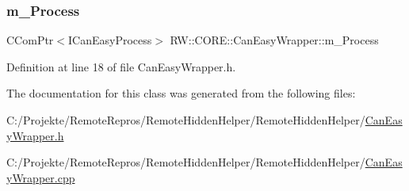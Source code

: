 \subsubsection{\texorpdfstring{m\+\_\+\+Process}{m\_Process}}
{\footnotesize\ttfamily C\+Com\+Ptr$<$I\+Can\+Easy\+Process$>$ R\+W\+::\+C\+O\+R\+E\+::\+Can\+Easy\+Wrapper\+::m\+\_\+\+Process\hspace{0.3cm}{\ttfamily [private]}}



Definition at line 18 of file Can\+Easy\+Wrapper.\+h.



The documentation for this class was generated from the following files\+:\begin{DoxyCompactItemize}
\item 
C\+:/\+Projekte/\+Remote\+Repros/\+Remote\+Hidden\+Helper/\+Remote\+Hidden\+Helper/\hyperlink{_can_easy_wrapper_8h}{Can\+Easy\+Wrapper.\+h}\item 
C\+:/\+Projekte/\+Remote\+Repros/\+Remote\+Hidden\+Helper/\+Remote\+Hidden\+Helper/\hyperlink{_can_easy_wrapper_8cpp}{Can\+Easy\+Wrapper.\+cpp}\end{DoxyCompactItemize}
